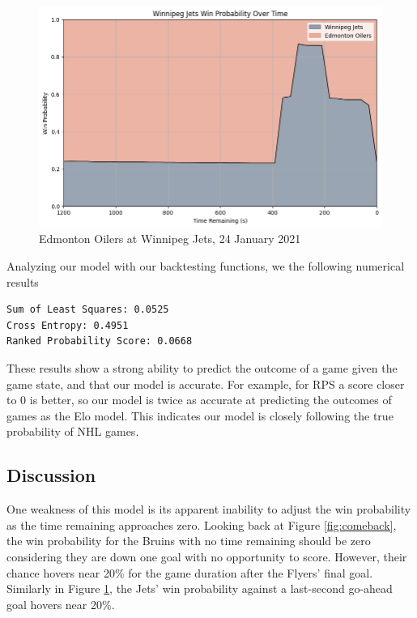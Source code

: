 \documentclass{article}
\begin{document}
\begin{figure}
    \centering
    \includegraphics[width=1\linewidth]{2020020086.png}
    \caption{Edmonton Oilers at Winnipeg Jets, 24 January 2021}
    \label{fig:goahead}
\end{figure}

Analyzing our model with our backtesting functions, we the following numerical results


\begin{verbatim}
Sum of Least Squares: 0.0525
Cross Entropy: 0.4951
Ranked Probability Score: 0.0668
\end{verbatim}

These results show a strong ability to predict the outcome of a game given the game state, and that our model is accurate. For example, for RPS a score closer to 0 is better, so our model is twice as accurate
at predicting the outcomes of games as the Elo model. This indicates our model is closely following the true probability of NHL games.

\subsection{Discussion}
One weakness of this model is its apparent inability to adjust the win probability as the time remaining approaches zero.
Looking back at Figure \ref{fig:comeback}, the win probability for the Bruins with no time remaining should be zero considering they are down one goal with no opportunity to score.
However, their chance hovers near 20\% for the game duration after the Flyers' final goal.
Similarly in Figure \ref{fig:goahead}, the Jets' win probability against a last-second go-ahead goal hovers near 20\%.
\end{document}
